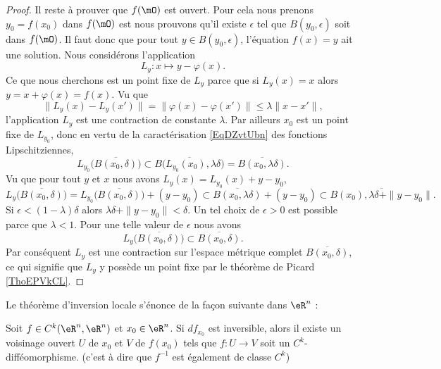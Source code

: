 \begin{proof}
    Il reste à prouver que \( f(\mO)\) est ouvert. Pour cela nous prenons \( y_0=f(x_0)\) dans \( f(\mO)\) est nous prouvons qu'il existe \( \epsilon\) tel que \( B(y_0,\epsilon)\) soit dans \( f(\mO)\). Il faut donc que pour tout \( y\in B(y_0,\epsilon)\), l'équation \( f(x)=y\) ait une solution. Nous considérons l'application
    \begin{equation}
        L_y\colon x\mapsto y-\varphi(x).
    \end{equation}
    Ce que nous cherchons est un point fixe de \( L_y\) parce que si \( L_y(x)=x\) alors \( y=x+\varphi(x)=f(x)\). Vu que
    \begin{equation}
        \big\| L_y(x)-L_y(x') \big\|=\big\| \varphi(x)-\varphi(x') \big\|\leq\lambda\| x-x' \|,
    \end{equation}
    l'application \( L_y\) est une contraction de constante \( \lambda\). Par ailleurs \( x_0\) est un point fixe de \( L_{y_0}\), donc en vertu de la caractérisation \eqref{EqDZvtUbn} des fonctions Lipschitziennes, 
    \begin{equation}
        L_{y_0}\big( \overline{ B(x_0,\delta) } \big)\subset \overline{ B\big( L_{y_0}(x_0),\lambda\delta \big) }=\overline{ B(x_0,\lambda\delta) }.
    \end{equation}
    Vu que pour tout \( y\) et \( x\) nous avons \( L_y(x)=L_{y_0}(x)+y-y_0\),
    \begin{equation}
    L_y\big( \overline{ B(x_0,\delta) } \big)=L_{y_0}\big( \overline{ B(x_0,\delta) } \big)+(y-y_0)\subset \overline{ B(x_0,\lambda\delta) }+(y-y_0)\subset \overline{ B(x_0),\lambda\delta+\| y-y_0 \| }.
    \end{equation}
    Si \( \epsilon<(1-\lambda)\delta\) alors \( \lambda\delta+\| y-y_0 \|<\delta\). Un tel choix de \( \epsilon>0\) est possible parce que \( \lambda<1\). Pour une telle valeur de \( \epsilon\) nous avons
    \begin{equation}
        L_y\big( \overline{ B(x_0,\delta) } \big)\subset \overline{ B(x_0,\delta) }.
    \end{equation}
    Par conséquent \( L_y\) est une contraction sur l'espace métrique complet \( \overline{ B(x_0,\delta) }\), ce qui signifie que \( L_y\) y possède un point fixe par le théorème de Picard \ref{ThoEPVkCL}.
\end{proof}

Le théorème d'inversion locale s'énonce de la façon suivante dans \( \eR^n\) :
\begin{theorem}[Inversion locale dans \( \eR^n\)] %
    Soit \( f\in C^k(\eR^n,\eR^n)\) et \( x_0\in \eR^n\). Si \( df_{x_0}\) est inversible, alors il existe un voisinage ouvert \( U\) de \( x_0\) et \( V\) de \( f(x_0)\) tels que \( f\colon U\to V\) soit un \( C^k\)-difféomorphisme. (c'est à dire que \( f^{-1}\) est également de classe \( C^k\))
\end{theorem}

